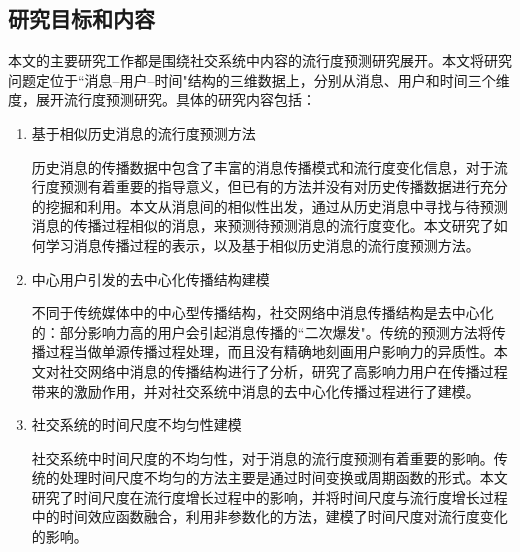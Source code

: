 \subsection{研究目标和内容}
本文的主要研究工作都是围绕社交系统中内容的流行度预测研究展开。本文将研究问题定位于``消息--用户--时间"结构的三维数据上，分别从消息、用户和时间三个维度，展开流行度预测研究。具体的研究内容包括：
\begin{enumerate}
\item 基于相似历史消息的流行度预测方法

历史消息的传播数据中包含了丰富的消息传播模式和流行度变化信息，对于流行度预测有着重要的指导意义，但已有的方法并没有对历史传播数据进行充分的挖掘和利用。本文从消息间的相似性出发，通过从历史消息中寻找与待预测消息的传播过程相似的消息，来预测待预测消息的流行度变化。本文研究了如何学习消息传播过程的表示，以及基于相似历史消息的流行度预测方法。
\item 中心用户引发的去中心化传播结构建模

不同于传统媒体中的中心型传播结构，社交网络中消息传播结构是去中心化的：部分影响力高的用户会引起消息传播的``二次爆发"。传统的预测方法将传播过程当做单源传播过程处理，而且没有精确地刻画用户影响力的异质性。本文对社交网络中消息的传播结构进行了分析，研究了高影响力用户在传播过程带来的激励作用，并对社交系统中消息的去中心化传播过程进行了建模。
\item 社交系统的时间尺度不均匀性建模

社交系统中时间尺度的不均匀性，对于消息的流行度预测有着重要的影响。传统的处理时间尺度不均匀的方法主要是通过时间变换或周期函数的形式。本文研究了时间尺度在流行度增长过程中的影响，并将时间尺度与流行度增长过程中的时间效应函数融合，利用非参数化的方法，建模了时间尺度对流行度变化的影响。
\end{enumerate}
